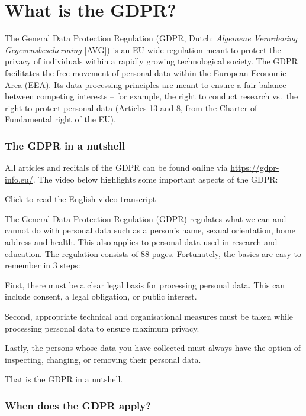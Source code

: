 \documentclass[
]{book}
\begin{document}
\hypertarget{what-is-the-gdpr}{%
\section{What is the GDPR?}\label{what-is-the-gdpr}}

The General Data Protection Regulation (GDPR, Dutch: \emph{Algemene Verordening
Gegevensbescherming} {[}AVG{]}) is an EU-wide regulation meant to protect the privacy
of individuals within a rapidly growing technological society. The GDPR facilitates
the free movement of personal data within the European Economic Area (EEA). Its
data processing principles are meant to ensure a fair balance between competing
interests -- for example, the right to conduct research vs.~the right to protect
personal data (Articles 13 and 8, from the Charter of Fundamental right of the EU).

\hypertarget{the-gdpr-in-a-nutshell}{%
\subsubsection{The GDPR in a nutshell}\label{the-gdpr-in-a-nutshell}}

All articles and recitals of the GDPR can be found online via \url{https://gdpr-info.eu/}.
The video below highlights some important aspects of the GDPR:

Click to read the English video transcript

The General Data Protection Regulation (GDPR) regulates what we can
and cannot do with personal data such as a person's name, sexual orientation,
home address and health. This also applies to personal data used in research
and education. The regulation consists of 88 pages. Fortunately, the basics
are easy to remember in 3 steps:

First, there must be a clear legal basis for processing personal data. This can
include consent, a legal obligation, or public interest.

Second, appropriate technical and organisational measures must be taken
while processing personal data to ensure maximum privacy.

Lastly, the persons whose data you have collected must always have the
option of inspecting, changing, or removing their personal data.

That is the GDPR in a nutshell.

\hypertarget{gdpr-scope}{%
\subsubsection{When does the GDPR apply?}\label{gdpr-scope}}
\end{document}
